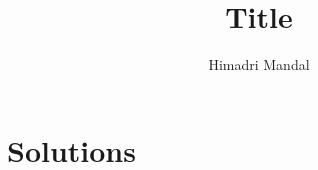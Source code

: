 \documentclass[11pt]{scrartcl}
\title{Title}
\author{Himadri Mandal}
\begin{document}
\maketitle

\section{Solutions}
\end{document}
